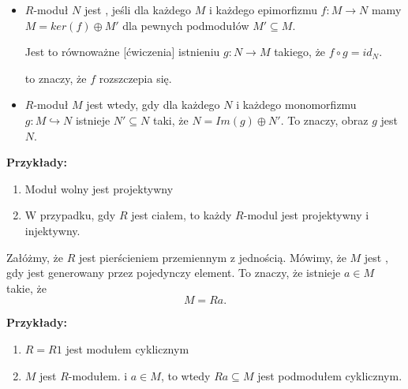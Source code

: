 \begin{definition}$ $

  \begin{itemize}
    \item[\PHtunny] $R$-moduł $N$ jest , jeśli dla każdego $M$ i każdego epimorfizmu $f:M\to N$ mamy $M=ker(f)\oplus M'$ dla pewnych podmodułów $M'\subseteq M$. 

      Jest to równoważne [ćwiczenia] istnieniu $g:N\to M$ takiego, że $f\circ g=id_N$.

      \begin{center}\end{center}

      to znaczy, że $f$ rozszczepia się.
    \item[\PHtunny] $R$-moduł $M$ jest  wtedy, gdy dla każdego $N$ i każdego monomorfizmu $g:M\hookrightarrow N$ istnieje $N'\subseteq N$ taki, że $N=Im(g)\oplus N'$. To znaczy, obraz $g$ jest  $N$.
  \end{itemize}
\end{definition}

\textbf{Przykłady:} 
\begin{enumerate}
  \item Moduł wolny jest projektywny
  \item W przypadku, gdy $R$ jest ciałem, to każdy $R$-modul jest projektywny i injektywny.
\end{enumerate}

\begin{definition}
  Załóżmy, że $R$ jest pierścieniem przemiennym z jednością. Mówimy, że $M$ jest , gdy jest generowany przez pojedynczy element. To znaczy, że istnieje $a\in M$ takie, że
  $$M=Ra.$$
\end{definition}

\textbf{Przykłady:}
\begin{enumerate}
  \item $R=R1$ jest modułem cyklicznym
  \item $M$ jest $R$-modułem. i $a\in M$, to wtedy $Ra\subseteq M$ jest podmodułem cyklicznym.
\end{enumerate}

